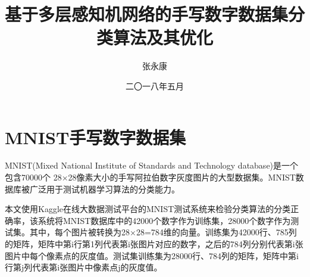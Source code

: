 \documentclass[forprint]{WHUBachelor}
\begin{document}

\miji{ }                                      %

\title{基于多层感知机网络的手写数字数据集分类算法及其优化}
\author{张永康}                            %
\date{二〇一八年五月}                    %

\maketitle
\frontmatter
{}              %
\tableofcontents
\mainmatter %
\chapter{MNIST手写数字数据集}
 
  MNIST(Mixed National Institute of Standards and Technology database)是一个包含70000个
  28×28像素大小的手写阿拉伯数字灰度图片的大型数据集。MNIST数据库被广泛用于测试机器学习算法的分类能力。
  
  本文使用Kaggle在线大数据测试平台的MNIST测试系统来检验分类算法的分类正确率，该系统将MNIST数据库中的42000个数字作为训练集，28000个数字作为测试集。其中，每个图片被转换为28×28=784维的向量。训练集为42000行、785列的矩阵，矩阵中第i行第1列代表第i张图片对应的数字，之后的784列分别代表第i张图片中每个像素点的灰度值。测试集训练集为28000行、784列的矩阵，矩阵中第i行第j列代表第i张图片中像素点j的灰度值。
\end{document}
